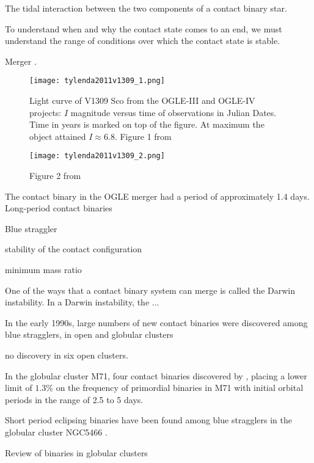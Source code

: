 \documentclass[12pt]{article} %
\numberwithin{equation}{section} %
\begin{document}
The tidal interaction between the two components of a contact binary star.

To understand when and why the contact state comes to an end, we must understand the range of conditions over which the contact state is stable.

Merger \citet{tylenda2011v1309}.

\begin{figure}[H]
\centering
\texttt{[image: tylenda2011v1309\_1.png]}
\caption{Light curve of V1309 Sco from the OGLE-III and OGLE-IV projects: $I$ magnitude versus time of observations in Julian Dates. Time in years is marked on top of the figure. At maximum the object attained $I \approx 6.8$. Figure 1 from \citet{tylenda2011v1309}}
\label{fig: tylenda2011v1309_1}
\end{figure}

\begin{figure}[H]
\centering
\texttt{[image: tylenda2011v1309\_2.png]}
\caption{Figure 2 from \citet{tylenda2011v1309}}
\label{fig: tylenda2011v1309_2}
\end{figure}


The contact binary in the OGLE merger had a period of approximately 1.4 days. Long-period contact binaries \citep{rucinski1998eclipsing} 

Blue straggler \citet{andronov2006mergers}

stability of the contact configuration \citep{rasio1995minimum}

minimum mass ratio \citep{arbutina2009possible} \citep{arbutina2009}

One of the ways that a contact binary system can merge is called the Darwin instability. In a Darwin instability, the ...

In the early 1990s, large numbers of new contact binaries were discovered among blue stragglers, in open and globular clusters 

\citep{kaluzny1988ccd} no discovery in six open clusters.

In the globular cluster M71, four contact binaries discovered by \citet{yan1994primordial}, placing a lower limit of $1.3\%$ on the frequency of primordial binaries in M71 with initial orbital periods in the range of 2.5 to 5 days. 

Short period eclipsing binaries have been found among blue stragglers in the globular cluster NGC5466 \citep{mateo1990blue}.

Review of binaries in globular clusters \citep{hut1992binaries}
\end{document}
